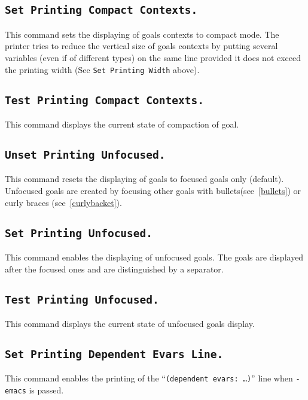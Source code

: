 \subsection[\tt Set Printing Compact Contexts.]{\tt Set Printing Compact Contexts.}
This command sets the displaying of goals contexts to compact mode.
The printer tries to reduce the vertical size of goals contexts by
putting several variables (even if of different types) on the same
line provided it does not exceed the printing width (See {\tt Set
  Printing Width} above).

\subsection[\tt Test Printing Compact Contexts.]{\tt Test Printing Compact Contexts.}
This command displays the current state of compaction of goal.


\subsection[\tt Unset Printing Unfocused.]{\tt Unset Printing Unfocused.}
This command resets the displaying of goals to focused goals only
(default). Unfocused goals are created by focusing other goals with
bullets(see~\ref{bullets}) or curly braces (see~\ref{curlybacket}).

\subsection[\tt Set Printing Unfocused.]{\tt Set Printing Unfocused.}
This command enables the displaying of unfocused goals. The goals are
displayed after the focused ones and are distinguished by a separator.

\subsection[\tt Test Printing Unfocused.]{\tt Test Printing Unfocused.}
This command displays the current state of unfocused goals display.

\subsection[\tt Set Printing Dependent Evars Line.]{\tt Set Printing Dependent Evars Line.}
This command enables the printing of the ``{\tt (dependent evars: \ldots)}''
line when {\tt -emacs} is passed.

